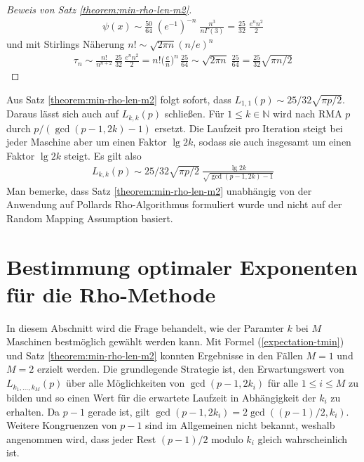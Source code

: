 \documentclass[a4paper, 10pt, ngerman]{article}
\newcommand{\N}{\mathbb{N}}
\begin{document}
\begin{proof}[Beweis von Satz \ref{theorem:min-rho-len-m2}]
        \begin{align*}
            [x^n] \psi(x)
            \sim \frac {50} {64} \; (e^{-1})^{-n} \;
            \frac {n^3} {n \Gamma(3)}
            = \frac {25} {32} \; \frac {e^n n^2} {2}
        \end{align*}
        und mit Stirlings Näherung $n! \sim \sqrt{2\pi n} (n/e)^n$
        \begin{align*}
            \tau_n
            \sim \frac {n!}{n^{n + 2}} \, \frac {25} {32} \,\frac {e^n n^2} 2
            = n! \bigg (\frac {e} {n} \bigg )^n \, \frac {25} {64}
            \sim \sqrt {2 \pi n} \; \frac {25}{64}
            = \frac {25} {32} \sqrt{\pi n/2}
        \end{align*}
    \end{proof}

    \noindent Aus Satz \ref{theorem:min-rho-len-m2} folgt sofort, dass $L_{1, 1}(p) \sim 25/32 \sqrt{\pi p / 2}$. Daraus lässt sich auch auf $L_{k, k}(p)$ schließen. Für $1 \le k \in \N$ wird nach RMA $p$ durch $p/(\gcd(p - 1, 2k) - 1)$ ersetzt. Die Laufzeit pro Iteration steigt bei jeder Maschine aber um einen Faktor $\lg 2k$, sodass sie auch insgesamt um einen Faktor $\lg 2k$ steigt. Es gilt also
    \begin{align}
        L_{k, k}(p) \sim 25 / 32 \sqrt{\pi p /2} \
        \frac {\lg 2k} {\sqrt{\gcd(p - 1, 2k) - 1}}
        \label{lkkp}
    \end{align}
    Man bemerke, dass Satz \ref{theorem:min-rho-len-m2} unabhängig von der Anwendung auf Pollards Rho-Algorithmus formuliert wurde und nicht auf der Random Mapping Assumption basiert.

    \section{Bestimmung optimaler Exponenten für die Rho-Methode}
    \label{sec:optimal-k}

    In diesem Abschnitt wird die Frage behandelt, wie der Paramter $k$ bei $M$ Maschinen bestmöglich gewählt werden kann. Mit Formel (\ref{expectation-tmin}) und Satz \ref{theorem:min-rho-len-m2} konnten Ergebnisse in den Fällen $M = 1$ und $M = 2$ erzielt werden. Die grundlegende Strategie ist, den Erwartungswert von $L_{k_1, \dots, k_M}(p)$ über alle Möglichkeiten von $\gcd(p - 1, 2k_i)$ für alle $1 \le i \le M$ zu bilden und so einen Wert für die erwartete Laufzeit in Abhängigkeit der $k_i$ zu erhalten. Da $p - 1$ gerade ist, gilt $\gcd(p-1, 2k_i) = 2\gcd((p - 1)/2, k_i)$. Weitere Kongruenzen von $p - 1$ sind im Allgemeinen nicht bekannt, weshalb angenommen wird, dass jeder Rest $(p- 1)/2$ modulo $k_i$ gleich wahrscheinlich ist.
\end{document}
